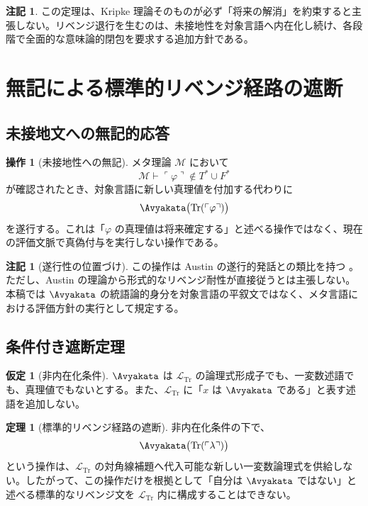 \documentclass[11pt,a4paper]{article}
\theoremstyle{definition}
\newtheorem{assumption}[definition]{仮定}
\newtheorem{remark}[definition]{注記}
\newtheorem{operation}[definition]{操作}
\theoremstyle{definition}
\newtheorem{theorem}[definition]{定理}
\newcommand{\Tr}{\mathrm{Tr}}
\newcommand{\Meta}{\mathcal{M}}
\newcommand{\Lang}{\mathcal{L}}
\begin{document}
\begin{remark}
この定理は、Kripke 理論そのものが必ず「将来の解消」を約束すると主張しない。リベンジ退行を生むのは、未接地性を対象言語へ内在化し続け、各段階で全面的な意味論的閉包を要求する追加方針である。
\end{remark}

\section{無記による標準的リベンジ経路の遮断}

\subsection{未接地文への無記的応答}

\begin{operation}[未接地性への無記]
メタ理論 $\Meta$ において
\[
 \Meta\vdash
 \ulcorner\varphi\urcorner\notin T^*\cup F^*
\]
が確認されたとき、対象言語に新しい真理値を付加する代わりに
\[
 \Avyakata\bigl(\Tr(\ulcorner\varphi\urcorner)\bigr)
\]
を遂行する。これは「$\varphi$ の真理値は将来確定する」と述べる操作ではなく、現在の評価文脈で真偽付与を実行しない操作である。
\end{operation}

\begin{remark}[遂行性の位置づけ]
この操作は Austin の遂行的発話との類比を持つ \cite{Austin1962}。ただし、Austin の理論から形式的なリベンジ耐性が直接従うとは主張しない。本稿では $\Avyakata$ の統語論的身分を対象言語の平叙文ではなく、メタ言語における評価方針の実行として規定する。
\end{remark}

\subsection{条件付き遮断定理}

\begin{assumption}[非内在化条件]
$\Avyakata$ は $\Lang_{\Tr}$ の論理式形成子でも、一変数述語でも、真理値でもないとする。また、$\Lang_{\Tr}$ に「$x$ は $\Avyakata$ である」と表す述語を追加しない。
\end{assumption}

\begin{theorem}[標準的リベンジ経路の遮断]
非内在化条件の下で、
\[
 \Avyakata\bigl(\Tr(\ulcorner\lambda\urcorner)\bigr)
\]
という操作は、$\Lang_{\Tr}$ の対角線補題へ代入可能な新しい一変数論理式を供給しない。したがって、この操作だけを根拠として「自分は $\Avyakata$ ではない」と述べる標準的なリベンジ文を $\Lang_{\Tr}$ 内に構成することはできない。
\end{theorem}
\end{document}
